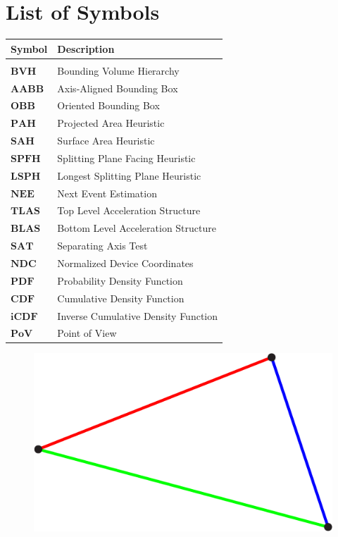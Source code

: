 \documentclass{PoliMi_MasterThesis}
\newcommand*\triangleLogo{
	\clearpage
	\thispagestyle{empty}
	\newpage
	\begin{figure}
		\centering
		\includegraphics[width=\textwidth]{Images/triangle_logo_thin.png} 
	\end{figure}
}
\begin{document}
\chapter*{List of Symbols}
\begin{table}[H]
    \centering
    \begin{tabular}{ll}
        \textbf{Symbol} & \textbf{Description}\\\hline\\[-9px]
        $\bm{BVH}$ & Bounding Volume Hierarchy\\[2px]
        $\bm{AABB}$ & Axis-Aligned Bounding Box\\[2px]
        $\bm{OBB}$ & Oriented Bounding Box\\[2px]
        $\bm{PAH}$ & Projected Area Heuristic\\[2px]
        $\bm{SAH}$ & Surface Area Heuristic\\[2px]
        $\bm{SPFH}$ & Splitting Plane Facing Heuristic\\[2px]
        $\bm{LSPH}$ & Longest Splitting Plane Heuristic\\[2px]
        $\bm{NEE}$ & Next Event Estimation\\[2px]
        $\bm{TLAS}$ & Top Level Acceleration Structure\\[2px]
        $\bm{BLAS}$ & Bottom Level Acceleration Structure\\[2px]
        $\bm{SAT}$ & Separating Axis Test\\[2px]
        $\bm{NDC}$ & Normalized Device Coordinates\\[2px]
        $\bm{PDF}$ & Probability Density Function\\[2px]
        $\bm{CDF}$ & Cumulative Density Function\\[2px]
        $\bm{iCDF}$ & Inverse Cumulative Density Function\\[2px]
        $\bm{PoV}$ & Point of View\\[2px]
    \end{tabular}
\end{table}



\ClearShipoutPicture

\triangleLogo
\end{document}

